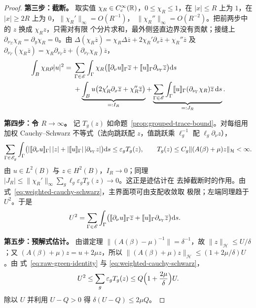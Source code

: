 \begin{proof}
  \smallskip\noindent\textbf{第三步：截断。}
  取实值 $\chi_R\in C_c^\infty(\mathbb{R})$，$0\leq\chi_R\leq1$，在 $|x|\leq R$ 上为 $1$，在
  $|x|\geq2R$ 上为 $0$，$\lVert\chi_R'\rVert_\infty=O(R^{-1})$，
  $\lVert\chi_R''\rVert_\infty=O(R^{-2})$。把前两步中的 $z$ 换成 $\chi_Rz$，只需对有限
  个分片求和，最外侧竖直边界没有贡献；接缝上 $\partial_{\nu_\Sigma}\chi_R=\partial_y\chi_R=0$。由
  $\Delta(\chi_R\overline z)=\chi_R\Delta\overline z+2\chi_R'\partial_x\overline z
  +\chi_R''\overline z$ 及
  $\partial_{\nu_\Gamma}(\chi_R\overline z)=\chi_R\partial_{\nu_\Gamma}\overline z
  +(\partial_{\nu_\Gamma}\chi_R)\overline z$，
  \begin{align*}
    \int_B\chi_R\rho|u|^2
    ={}&\sum_{\Gamma\in\mathscr E}\int_\Gamma\chi_R\bigl(\llbracket \partial_\nu u\rrbracket_\Gamma\overline z
      +\llbracket u\rrbracket_\Gamma\partial_{\nu_\Gamma}\overline z\bigr)\mathrm{d} s\\
    &+\underbrace{\int_Bu\bigl(2\chi_R'\partial_x\overline z+\chi_R''\overline z\bigr)}_{=:I_R}
    +\underbrace{\sum_{\Gamma\in\mathscr E}\int_\Gamma
      \llbracket u\rrbracket_\Gamma(\partial_{\nu_\Gamma}\chi_R)\overline z\,\mathrm{d} s}_{=:J_R}.
  \end{align*}

  \smallskip\noindent\textbf{第四步：令 $R\to\infty$。}
  记 $T_g(z)$ 如命题~\ref{prop:grouped-trace-bound}。对每组用加权 Cauchy--Schwarz
  不等式（法向跳跃配 $z$，值跳跃乘 $\ell_g^{-1}$ 配 $\ell_g\partial_\nu z$），
  \begin{align}
    \sum_{\Gamma\in\mathscr E_g}\int_\Gamma
      \bigl(|\llbracket \partial_\nu u\rrbracket_\Gamma|\,|z|+|\llbracket u\rrbracket_\Gamma|\,|\partial_{\nu_\Gamma}z|\bigr)\mathrm{d} s
    \leq\varepsilon_gT_g(z),
    \qquad T_g(z)\leq C_g\lVert(A(\beta)+\mu)z\rVert_{\mathcal H}<\infty.
    \label{eq:weighted-cauchy-schwarz}
  \end{align}
  由 $u\in L^2(B)$ 与 $z\in H^2(B)$，$I_R\to0$；同理
  $|J_R|\leq\lVert\chi_R'\rVert_\infty\sum_g\ell_g\varepsilon_gT_g(z)\to0$。这正是迹估计在
  去掉截断时的作用。由式~\eqref{eq:weighted-cauchy-schwarz}，主界面项可由支配收敛取
  极限；左端同理趋于 $U^2$。于是
  \begin{align}
    U^2&=\sum_{\Gamma\in\mathscr E}\int_\Gamma
      \bigl(\llbracket \partial_\nu u\rrbracket_\Gamma\overline z
        +\llbracket u\rrbracket_\Gamma\partial_{\nu_\Gamma}\overline z\bigr)\mathrm{d} s.
    \label{eq:raw-green-identity}
  \end{align}

  \smallskip\noindent\textbf{第五步：预解式估计。}
  由谱定理 $\lVert(A(\beta)-\mu)^{-1}\rVert=\delta^{-1}$，故
  $\lVert z\rVert_{\mathcal H}\leq U/\delta$；又 $(A(\beta)+\mu)z=u+2\mu z$，所以
  $\lVert(A(\beta)+\mu)z\rVert_{\mathcal H}\leq(1+2\mu/\delta)U$。由
  式~\eqref{eq:raw-green-identity} 与 \eqref{eq:weighted-cauchy-schwarz}，
  \begin{align*}
    U^2\leq\sum_g\varepsilon_gT_g(z)
    \leq Q\Bigl(1+\frac{2\mu}{\delta}\Bigr)U.
  \end{align*}
  除以 $U$ 并利用 $U-Q>0$ 得 $\delta(U-Q)\leq2\mu Q$。
\end{proof}

